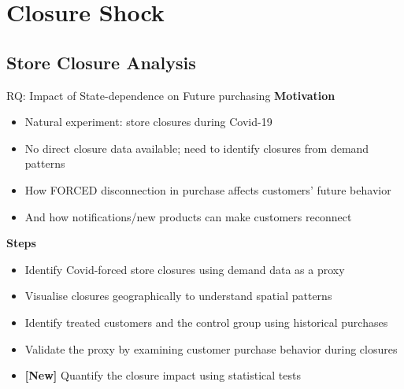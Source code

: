 \documentclass[aspectratio=169]{beamer}  %
\begin{document}
\section{Closure Shock}
\subsection{Store Closure Analysis}

\begin{frame}{RQ: Impact of State-dependence on Future purchasing}
\textbf{Motivation}
\begin{itemize}
    \item Natural experiment: store closures during Covid-19
    \item No direct closure data available; need to identify closures from demand patterns
    \item How FORCED disconnection in purchase affects customers' future behavior
    \item And how notifications/new products can make customers reconnect
\end{itemize}

\vspace{0.3cm}

\textbf{Steps}
\begin{itemize}
    \item Identify Covid-forced store closures using demand data as a proxy
    \item Visualise closures geographically to understand spatial patterns
    \item Identify treated customers and the control group using historical purchases
    \item Validate the proxy by examining customer purchase behavior during closures
    \item \textbf{[New]} Quantify the closure impact using statistical tests
\end{itemize}
\end{frame}
\end{document}
